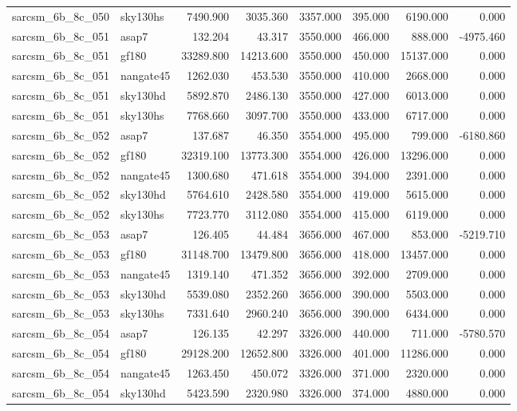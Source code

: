 \begin{tabular}{llrrrrrr}
sarcsm\_6b\_8c\_050 & sky130hs & 7490.900 & 3035.360 & 3357.000 & 395.000 & 6190.000 & 0.000 \\
sarcsm\_6b\_8c\_051 & asap7 & 132.204 & 43.317 & 3550.000 & 466.000 & 888.000 & -4975.460 \\
sarcsm\_6b\_8c\_051 & gf180 & 33289.800 & 14213.600 & 3550.000 & 450.000 & 15137.000 & 0.000 \\
sarcsm\_6b\_8c\_051 & nangate45 & 1262.030 & 453.530 & 3550.000 & 410.000 & 2668.000 & 0.000 \\
sarcsm\_6b\_8c\_051 & sky130hd & 5892.870 & 2486.130 & 3550.000 & 427.000 & 6013.000 & 0.000 \\
sarcsm\_6b\_8c\_051 & sky130hs & 7768.660 & 3097.700 & 3550.000 & 433.000 & 6717.000 & 0.000 \\
sarcsm\_6b\_8c\_052 & asap7 & 137.687 & 46.350 & 3554.000 & 495.000 & 799.000 & -6180.860 \\
sarcsm\_6b\_8c\_052 & gf180 & 32319.100 & 13773.300 & 3554.000 & 426.000 & 13296.000 & 0.000 \\
sarcsm\_6b\_8c\_052 & nangate45 & 1300.680 & 471.618 & 3554.000 & 394.000 & 2391.000 & 0.000 \\
sarcsm\_6b\_8c\_052 & sky130hd & 5764.610 & 2428.580 & 3554.000 & 419.000 & 5615.000 & 0.000 \\
sarcsm\_6b\_8c\_052 & sky130hs & 7723.770 & 3112.080 & 3554.000 & 415.000 & 6119.000 & 0.000 \\
sarcsm\_6b\_8c\_053 & asap7 & 126.405 & 44.484 & 3656.000 & 467.000 & 853.000 & -5219.710 \\
sarcsm\_6b\_8c\_053 & gf180 & 31148.700 & 13479.800 & 3656.000 & 418.000 & 13457.000 & 0.000 \\
sarcsm\_6b\_8c\_053 & nangate45 & 1319.140 & 471.352 & 3656.000 & 392.000 & 2709.000 & 0.000 \\
sarcsm\_6b\_8c\_053 & sky130hd & 5539.080 & 2352.260 & 3656.000 & 390.000 & 5503.000 & 0.000 \\
sarcsm\_6b\_8c\_053 & sky130hs & 7331.640 & 2960.240 & 3656.000 & 390.000 & 6434.000 & 0.000 \\
sarcsm\_6b\_8c\_054 & asap7 & 126.135 & 42.297 & 3326.000 & 440.000 & 711.000 & -5780.570 \\
sarcsm\_6b\_8c\_054 & gf180 & 29128.200 & 12652.800 & 3326.000 & 401.000 & 11286.000 & 0.000 \\
sarcsm\_6b\_8c\_054 & nangate45 & 1263.450 & 450.072 & 3326.000 & 371.000 & 2320.000 & 0.000 \\
sarcsm\_6b\_8c\_054 & sky130hd & 5423.590 & 2320.980 & 3326.000 & 374.000 & 4880.000 & 0.000 \\

\end{tabular}
